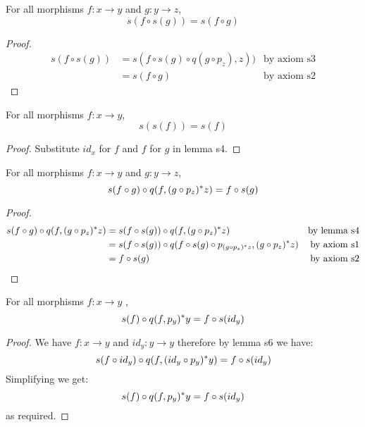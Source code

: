 \documentclass[10pt,a4paper]{scrartcl}
\begin{document}
\begin{lemma} [lemma s4]
\label{s4}  
For all morphisms $f: x \rightarrow y$ and $g:y \rightarrow z$,
$$s(f \circ s(g)) = s(f \circ g)$$
\end{lemma}
\begin{proof}
\begin{align*}
s( f \circ s(g)) 
    & = s( f \circ s(g)\circ q(g \circ p_z) , z ))  &\mbox{by axiom s3}\\
    & = s(f \circ g) &\mbox{by axiom s2} 
\end{align*}
\end{proof}

\begin{lemma} [lemma s5]
\label{s5}  
For all morphisms $f: x \rightarrow y$,
$$s(s(f)) = s(f)$$
\end{lemma}
\begin{proof}

Substitute $id_x$ for $f$  and $f$ for $g$ in lemma s4.

\end{proof}


\begin{lemma} [lemma s6]
\label{s6}  
For all morphisms $f: x \rightarrow y$ and $g:y \rightarrow z$,
$$s( f \circ g) \circ q(f,  (g \circ p_z) ^* z )=f \circ s(g)$$
\end{lemma}
\begin{proof}
\begin{align*}
s( f \circ g) \circ q(f,  (g \circ p_z) ^* z )
    & = s( f \circ s(g)) \circ q(f,  (g \circ p_z) ^* z )  &\mbox{by lemma s4}\\
    & = s( f \circ s(g)) \circ q(f \circ s(g) \circ p_{(g \circ p_z) ^* z},  (g \circ p_z) ^* z )  &\mbox{by axiom s1}\\
		& = f \circ s(g)  &\mbox{by axiom s2}
\end{align*}
\end{proof}

\begin{lemma} 
\label{s7}  
For all morphisms $f: x \rightarrow y$ ,
$$s(f) \circ q(f,p_y ) ^* y =f \circ s(id_y)$$

\end{lemma}
\begin{proof}

We have $f: x \rightarrow y$ and $id_y:y \rightarrow y$ therefore by lemma s6 we
have:
$$s(f \circ id_y) \circ q(f, (id_y \circ p_y) ^* y )=f \circ s(id_y)$$
\noindent
Simplifying we get:
$$s(f) \circ q(f,p_y) ^* y =f \circ s(id_y)$$
as required.
\end{proof}
\end{document}
